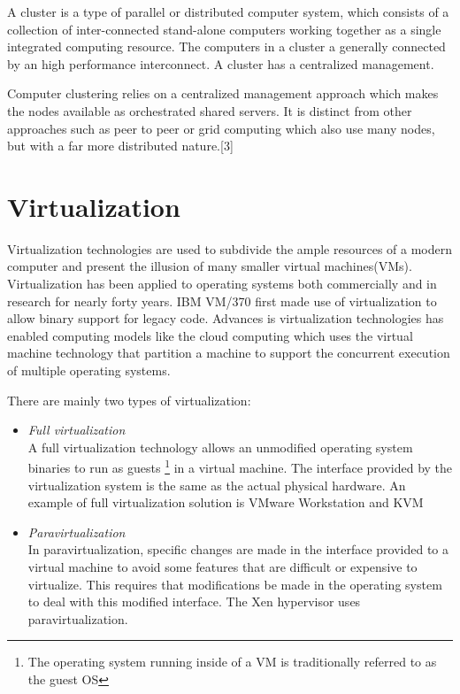 \documentclass[12pt,a4paper]{report}
\begin{document}
A cluster is a type of parallel or distributed computer system, which consists of a collection of
inter-connected stand-alone computers working together as a single integrated computing
resource\cite{pfister1998cluster}. The computers in a cluster a generally connected 
by an high performance interconnect. A cluster has a centralized management.

Computer clustering relies on a centralized management approach which makes the nodes available as orchestrated shared servers. It is distinct from other approaches such as peer to peer or grid computing which also use many nodes, but with a far more distributed nature.[3]



\section{Virtualization}


Virtualization technologies are 
used to subdivide the ample resources of a modern computer and present the illusion of many
smaller virtual machines(VMs)\cite{barham2003xen}.
Virtualization has been applied to operating systems both commercially and in research for nearly forty years.
IBM VM/370 first made use of virtualization to allow binary support for legacy code\cite{gum1983virt}.
Advances is virtualization technologies has enabled computing models like the cloud computing which uses
the virtual machine technology that partition a machine to support the concurrent
execution of multiple operating systems.

There are mainly two types of virtualization:\cite{matthews2007quantifying}

\begin{itemize}

 \item \emph{Full virtualization} \\
  A full virtualization technology allows an unmodified operating system binaries to run as 
guests \footnote{The operating system running inside of a VM is traditionally referred to as the guest OS} 
  in a virtual machine. The interface provided by the  virtualization system is the same as the actual physical
 hardware. An example of full virtualization solution is VMware Workstation\cite{website:vmware} and KVM \cite{website:kvm}

 \item \emph{Paravirtualization} \\
  In paravirtualization, specific changes are made in the interface provided to a virtual machine to avoid some features that are difficult or expensive to virtualize. This requires that modifications be made in the operating system to deal with this modified interface. The Xen hypervisor\cite{website:xen} uses paravirtualization.
\end{itemize}
\end{document}
